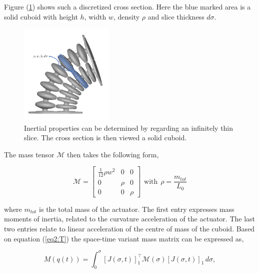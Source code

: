 Figure (\ref{fig:massapprox}) shows such a discretized cross section. Here the blue marked area is a solid cuboid with height $h$, width $w$, density $\rho$ and slice thickness $d\sigma$. 


\begin{figure}[H]
    \centering
    \includegraphics[width = 0.4\textwidth]{Figures/Chapter2/massapprox.png}
    \caption{Inertial properties can be determined by regarding an infinitely thin slice. The cross section is then viewed a solid cuboid.}
    \label{fig:massapprox}
\end{figure}


The mass tensor $\mathcal{M}$ then takes the following form,

\begin{equation}
    \mathcal{M} = \begin{bmatrix} \frac{1}{12}\rho w^2 & 0 & 0 \\
                                   0 & \rho & 0 \\
                                   0 & 0 & \rho \end{bmatrix}\hspace{5pt} \text{with} \hspace{5pt} \rho = \frac{m_{tot}}{L_0}
\end{equation} 




where $m_{tot}$ is the total mass of the actuator. The first entry expresses mass moments of inertia, related to the curvature acceleration of the actuator. The last two entries relate to linear acceleration of the centre of mass of the cuboid. Based on equation (\ref{eq2:T}) the space-time variant mass matrix can be expressed as, 


\begin{equation}
    M(q(t)) = \int_0^{\sigma} [J(\sigma,t)]_1^\top \mathcal{M}(\sigma)[J(\sigma,t)]_1  \hspace{2pt}d \sigma,
\end{equation}

